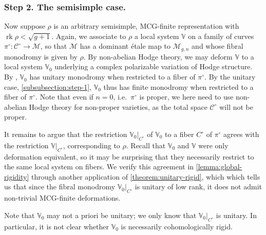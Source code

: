 \documentclass[12 pt]{amsart}
\theoremstyle{plain}
\theoremstyle{definition}
\theoremstyle{remark}
\numberwithin{equation}{section}
\DeclareMathOperator\rk{rk}
\begin{document}
\subsubsection{Step 2. The semisimple case.} 
\label{subsubsection:step-2}
Now suppose $\rho$ is an arbitrary
semisimple, MCG-finite representation with $\rk\rho<\sqrt{g+1}$. Again, we
associate to $\rho$ a local system $\mathbb{V}$ on a family of curves
$\pi^\circ:\mathscr{C}^\circ\to \mathscr{M}$, so that $\mathscr M$ has a
dominant \'etale map to $\mathscr M_{g,n}$ and whose fibral monodromy is given by $\rho$.
By non-abelian Hodge theory, we may deform $\mathbb{V}$ to a local system
$\mathbb V_0$ underlying a complex polarizable
variation of Hodge structure. By
\cite[Theorem 1.2.12]{LL:geometric-local-systems}, $\mathbb{V}_0$ has unitary monodromy when
restricted to a fiber of $\pi^\circ$. By the unitary case,
\autoref{subsubsection:step-1},
$\mathbb{V}_0$ thus has finite monodromy when restricted to a fiber of $\pi^{\circ}$. Note that even if $n=0$, i.e.~$\pi^\circ$ is proper, we here need to use non-abelian Hodge theory for non-proper varieties, as the total space $\mathscr{C}^\circ$ will not be proper.

It remains to argue that the restriction $\mathbb V_0|_{C^\circ}$ of
$\mathbb V_0$ to a fiber $C^\circ$ of
$\pi^\circ$ agrees with the restriction $\mathbb V|_{C^\circ}$,
corresponding to $\rho$.
Recall that 
$\mathbb V_0$ and $\mathbb V$ were only deformation equivalent, so it may be
surprising that they necessarily restrict to the same local system on fibers.
We verify this agreement 
in \autoref{lemma:global-rigidity}
through another application of
\autoref{theorem:unitary-rigid}, which 
which tells us that since the fibral monodromy $\mathbb{V}_0|_{C^\circ}$ 
is unitary of low rank, it
does not admit non-trivial MCG-finite deformations. 

Note that $\mathbb{V}_0$ may not a priori be unitary; we only know that $\mathbb V_0|_{C^\circ}$ is unitary. In particular, it is not clear whether $\mathbb{V}_0$ is necessarily cohomologically rigid.
\end{document}
